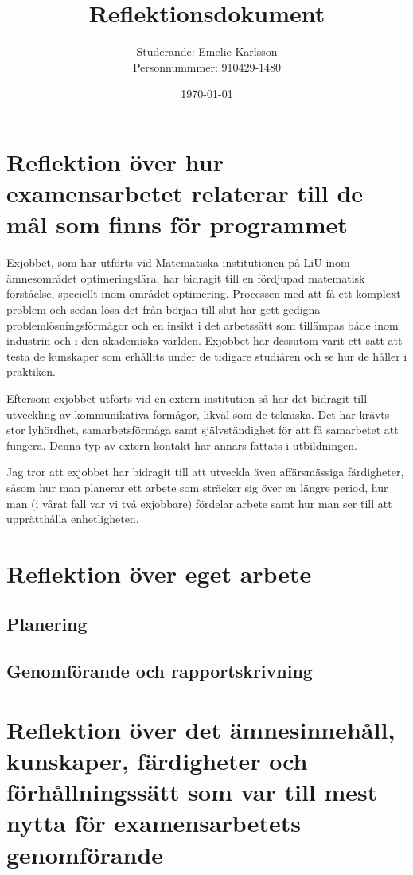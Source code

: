 \documentclass{article}
\title{Reflektionsdokument}
\author{Studerande: Emelie Karlsson \\ Personnummmer: 910429-1480}
\date{\today}
\begin{document}
 
\maketitle

 
\section*{Reflektion över hur examensarbetet relaterar till de mål som finns för programmet}

Exjobbet, som har utförts vid Matematiska institutionen på LiU inom ämnesområdet optimeringslära, har bidragit till en fördjupad matematisk förståelse, speciellt inom området optimering. Processen med att få ett komplext problem och sedan lösa det från början till slut har gett gedigna problemlösningsförmågor och en insikt i det arbetssätt som tillämpas både inom industrin och i den akademiska världen. Exjobbet har dessutom varit ett sätt att testa de kunskaper som erhållits under de tidigare studiåren och se hur de håller i praktiken. 

Eftersom exjobbet utförts vid en extern institution så har det bidragit till utveckling av kommunikativa förmågor, likväl som de tekniska. Det har krävts stor lyhördhet, samarbetsförmåga samt självständighet för att få samarbetet att fungera. Denna typ av extern kontakt har annars fattats i utbildningen.

Jag tror att exjobbet har bidragit till att utveckla även affärsmässiga färdigheter, såsom hur man planerar ett arbete som sträcker sig över en längre period, hur man (i vårat fall var vi två exjobbare) fördelar arbete samt hur man ser till att upprätthålla enhetligheten.

\section*{Reflektion över eget arbete}

\subsection*{Planering}
\subsection*{Genomförande och rapportskrivning}

\section*{Reflektion över det ämnesinnehåll, kunskaper, färdigheter och förhållningssätt som var till mest nytta för examensarbetets genomförande}
\end{document}
